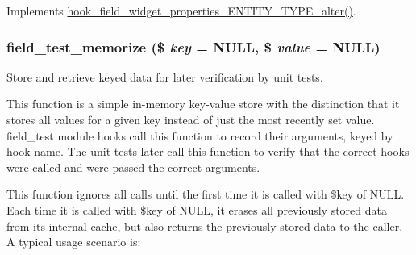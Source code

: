\label{field__test_8module_a7b260f9df700defdebb5dd957512f799}
Implements \hyperlink{group__field__storage_gafbf6029d00ade9df41649d247531f3ba}{hook\_\-field\_\-widget\_\-properties\_\-ENTITY\_\-TYPE\_\-alter()}. \hypertarget{field__test_8module_ad47dcd73d5f7aeb1f49a0bb0e302ef93}{
\subsubsection[{field\_\-test\_\-memorize}]{\setlength{\rightskip}{0pt plus 5cm}field\_\-test\_\-memorize (\$ {\em key} = {\ttfamily NULL}, \/  \$ {\em value} = {\ttfamily NULL})}}
\label{field__test_8module_ad47dcd73d5f7aeb1f49a0bb0e302ef93}
Store and retrieve keyed data for later verification by unit tests.

This function is a simple in-\/memory key-\/value store with the distinction that it stores all values for a given key instead of just the most recently set value. field\_\-test module hooks call this function to record their arguments, keyed by hook name. The unit tests later call this function to verify that the correct hooks were called and were passed the correct arguments.

This function ignores all calls until the first time it is called with \$key of NULL. Each time it is called with \$key of NULL, it erases all previously stored data from its internal cache, but also returns the previously stored data to the caller. A typical usage scenario is:





